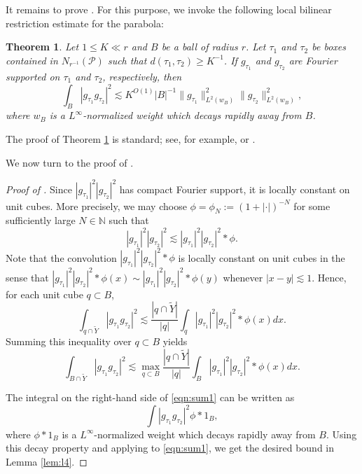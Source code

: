 \documentclass[11pt]{amsart}
\newtheorem{theorem}{Theorem}[section]
\theoremstyle{definition}
\theoremstyle{remark}
\newcommand{\cP}{\mathcal{P}}
\newcommand{\N}{\mathbb{N}}
\newcommand{\les}{\lesssim}
\begin{document}
It remains to prove . For this purpose, we invoke the following local bilinear restriction estimate for the parabola:


\begin{theorem}\label{thm:bil}
Let $1\le K\ll r$ and $B$ be a ball of radius $r$.
Let $\tau_1$ and $\tau_2$ be boxes contained in $N_{r^{-1}}(\cP)$ such that $d(\tau_1,\tau_2)\ge K^{-1}$. If $g_{\tau_1}$ and $g_{\tau_2}$ are Fourier supported on $\tau_1$ and $\tau_2$, respectively, then
\[
\int_B |g_{\tau_1}g_{\tau_2}|^2   \les K^{O(1)} |B|^{-1} \| g_{\tau_1} \|_{L^2(w_B)}^2 \| g_{\tau_2}  \|_{L^2(w_B)}^2,
\]
where $w_B$ is a $L^\infty$-normalized weight which decays rapidly away from $B$.
\end{theorem}
The proof of Theorem \ref{thm:bil} is standard; see, for example, \cite{TaoR} or \cite[Lemma 2.4]{SLee}.



We now turn to the proof of .

\begin{proof}[Proof of ]
Since $|g_{\tau_1}|^2 |g_{\tau_2}|^2$ has compact Fourier support, it is locally constant on unit cubes. 
More precisely, we may choose $\phi= \phi_N:= (1+|\cdot |)^{-N}$ for some sufficiently large $N \in \N$ such that
\[
|g_{\tau_1}|^2 |g_{\tau_2}|^2\les |g_{\tau_1}|^{2} |g_{\tau_2}|^{2} * \phi.
\]
Note that the convolution $|g_{\tau_1}|^{2} |g_{\tau_2}|^{2} * \phi $ is locally constant on unit cubes in the sense that  $|g_{\tau_1}|^{2} |g_{\tau_2}|^{2} * \phi(x) \sim |g_{\tau_1}|^{2} |g_{\tau_2}|^{2} * \phi(y)$ whenever $|x-y|\les 1$. Hence, for each unit cube $q\subset B$,
\[
\int_{q\cap \widetilde Y} |g_{\tau_1}g_{\tau_2}|^2
\les  \frac{|q\cap \widetilde Y|}{|q|} \int_{q}  |g_{\tau_1}|^{2} |g_{\tau_2}|^{2} * \phi (x) dx. \]
Summing this inequality over $q\subset B$ yields
\begin{equation}\label{eqn:sum1}
\int_{B\cap \widetilde Y} |g_{\tau_1}g_{\tau_2}|^2
\les \max_{q\subset B} \frac{|q\cap \widetilde Y|}{|q|} \int_{B}  |g_{\tau_1}|^{2} |g_{\tau_2}|^{2} * \phi (x) dx. 
\end{equation}


The integral on the right-hand side of \eqref{eqn:sum1} can be written as 
\[ \int |g_{\tau_1}g_{\tau_2}|^2 \phi*1_B,   \] 
where $\phi*1_B$ is a $L^\infty$-normalized weight which decays rapidly away from $B$. Using this decay property and applying  to \eqref{eqn:sum1}, we get the desired bound in Lemma \ref{lem:l4}.
\end{proof}
\end{document}
